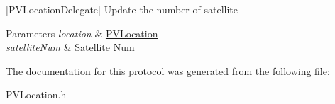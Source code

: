 \mbox{[}P\+V\+Location\+Delegate\mbox{]} Update the number of satellite


\begin{DoxyParams}{Parameters}
{\em location} & \hyperlink{interface_p_v_location}{P\+V\+Location} \\
\hline
{\em satellite\+Num} & Satellite Num \\
\hline
\end{DoxyParams}


The documentation for this protocol was generated from the following file\+:\begin{DoxyCompactItemize}
\item 
P\+V\+Location.\+h\end{DoxyCompactItemize}
